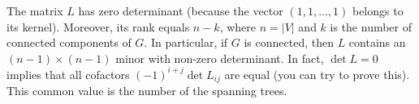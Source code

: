 

\setcounter{section}{2}
\setcounter{subsection}{5}
\setcounter{dfn}{14}


The matrix $L$ has zero determinant (because the vector $(1, 1, \ldots, 1)$ belongs to its kernel).
Moreover, its rank equals $n-k$, where $n = |V|$ and $k$ is the number of connected components of $G$.
In particular, if $G$ is connected, then $L$ contains an $(n-1) \times (n-1)$ minor with non-zero determinant.
In fact, $\det L = 0$ implies that all cofactors $(-1)^{i+j} \det L_{ij}$ are equal (you can try to prove this).
This common value is the number of the spanning trees.


